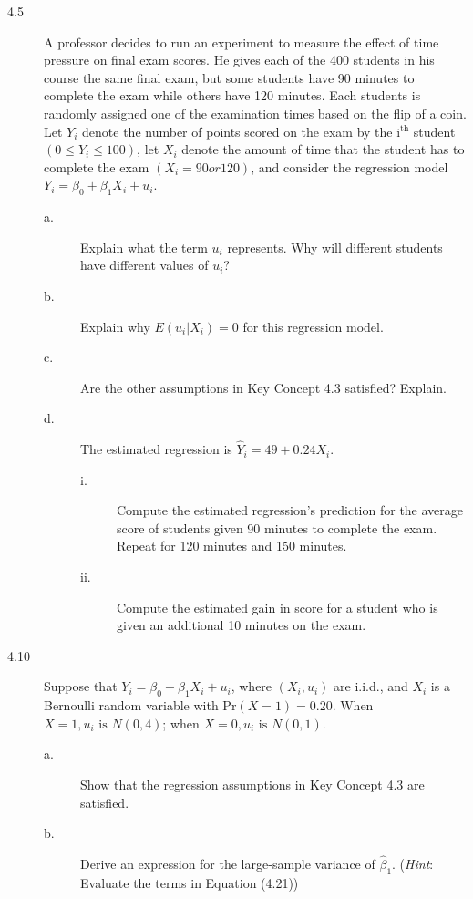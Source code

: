 \documentclass[a4paper,11pt]{article}
\newcommand{\pr}{\mathrm{Pr}}
\begin{document}
\begin{description}
\item[{4.5}] A professor decides to run an experiment to measure the
effect of time pressure on final exam scores. He gives each
of the 400 students in his course the same final exam, but
some students have 90 minutes to complete the exam while
others have 120 minutes. Each students is randomly assigned
one of the examination times based on the flip of a coin. Let
\(Y_i\) denote the number of points scored on the exam by the
i\(^{\text{th}}\) student \((0 \leq Y_i \leq 100)\), let \(X_i\) denote
the amount of time that the student has to complete the exam
\((X_i = 90 or 120)\), and consider the regression model \(Y_i =
         \beta_0 + \beta_1 X_i + u_i\).
\begin{description}
\item[{a.}] Explain what the term \(u_i\) represents. Why will different
students have different values of \(u_i\)?
\item[{b.}] Explain why \(E(u_i | X_i) = 0\) for this regression model.
\item[{c.}] Are the other assumptions in Key Concept 4.3 satisfied? Explain.
\item[{d.}] The estimated regression is \(\hat{Y}_i = 49 + 0.24 X_i\).
\begin{description}
\item[{i.}] Compute the estimated regression's prediction for the
average score of students given 90 minutes to complete the
exam. Repeat for 120 minutes and 150 minutes.
\item[{ii.}] Compute the estimated gain in score for a student who is
given an additional 10 minutes on the exam.
\end{description}
\end{description}
\end{description}

\vspace{0.5cm}

\begin{description}
\item[{4.10}] Suppose that \(Y_i = \beta_0 + \beta_1 X_i + u_i\), where
\((X_i, u_i)\) are i.i.d., and \(X_i\) is a Bernoulli random
variable with \(\pr(X=1) = 0.20\). When \(X=1, u_i \text{ is }
          N(0, 4)\); when \(X=0, u_i \text{ is } N(0, 1)\).
\begin{description}
\item[{a.}] Show that the regression assumptions in Key Concept 4.3 are satisfied.
\item[{b.}] Derive an expression for the large-sample variance of
\(\hat{\beta}_1\). (\emph{Hint}: Evaluate the terms in Equation
(4.21))
\end{description}
\end{description}
\end{document}
